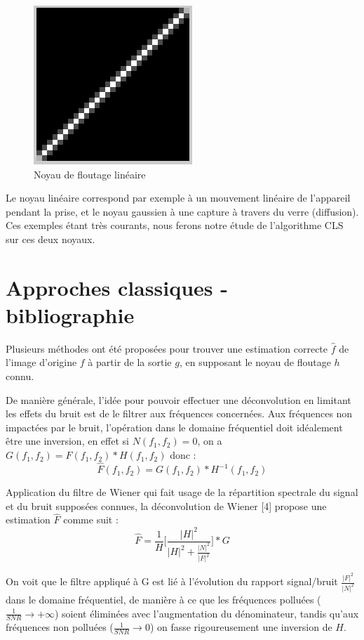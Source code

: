 \documentclass{article}
\begin{document}
	
	\begin{figure}[h]
	\begin{center}			
		\includegraphics[scale=0.48]{Img/blurkernel_linear}
	\end{center}
	\caption{Noyau de floutage linéaire}
	\end{figure}

	Le noyau linéaire correspond par exemple à un mouvement linéaire de l'appareil pendant la prise, et le noyau gaussien à une capture à travers du verre (diffusion).
	Ces exemples étant très courants, nous ferons notre étude de l'algorithme CLS sur ces deux noyaux.
	

\section{Approches classiques - bibliographie}

	Plusieurs méthodes ont été proposées pour trouver une estimation correcte $\hat f$ de l'image d'origine $f$ à partir de la sortie $g$, en supposant le noyau de floutage $h$ connu.
	
	De manière générale, l'idée pour pouvoir effectuer une déconvolution en limitant les effets du bruit est de le filtrer aux fréquences concernées. Aux fréquences non impactées par le bruit, l'opération dans le domaine fréquentiel doit idéalement être une inversion, en effet si $N(f_1,f_2) = 0$, on a $G(f_1,f_2) = \hat F(f_1,f_2) * H(f_1,f_2)$ donc :
	$$\hat F(f_1,f_2) = G(f_1,f_2) * H^{-1}(f_1,f_2)$$
	
	Application du filtre de Wiener qui fait usage de la répartition spectrale du signal et du bruit supposées connues, la déconvolution de Wiener [4] propose une estimation $\hat F$ comme suit :
	$$\hat F = \frac {1}{H} \bigg[ \frac {|H|^2}{|H|^2 + \frac {|N|^2}{|F|^2} } \bigg] * G$$
	
	On voit que le filtre appliqué à G est lié à l'évolution du rapport signal/bruit $\frac{|F|^2}{|N|^2}$ dans le domaine fréquentiel, de manière à ce que les fréquences polluées ($\frac{1}{SNR} { \rightarrow +\infty}$) soient éliminées avec l'augmentation du dénominateur, tandis qu'aux fréquences non polluées ($\frac{1}{SNR} { \rightarrow 0}$) on fasse rigoureusement une inversion de $H$.
	
\end{document}
